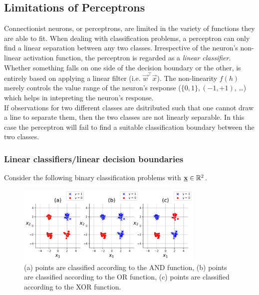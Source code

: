 \subsection{Limitations of Perceptrons}

Connectionist neurons, or perceptrons, are limited in the variety of functions they are able to fit. 
When dealing with classification problems, a perceptron can only find a linear separation between any two classes. Irrespective of the neuron's non-linear activation function, the perceptron is regarded as a \emph{linear classifier}. Whether something falls on one side of the decision boundary or the other, is entirely based on applying a linear filter (i.e. $\vec w^{\top} \vec x$). The non-linearity $f(h)$ merely controls the value range of the neuron's response ($\{0,1\}, (-1,+1)$, \ldots) which helps in intepreting the neuron's response.\\

If observations for two different classes are dsitributed such that one cannot draw a line to separate them, then the two classes
are not linearly separable. In this case the perceptron will fail to find a suitable classification boundary between the two classes.


\begin{frame}\frametitle{Linear classifiers/linear decision boundaries}

Consider the following binary classification problems with $\underline{\mathbf{x}} \in \mathbb{R}^2$.{}


\begin{figure}[h]
    \centering
	\includegraphics[width=0.8\textwidth]{img/and_or_xor_y}
	\caption{(a) points are classified according to the AND function,
	(b) points are classified according to the OR function,
	(c) points are classified according to the XOR function.
	}
	\label{fig:and_or_xor} 
\end{figure}


\end{frame}

